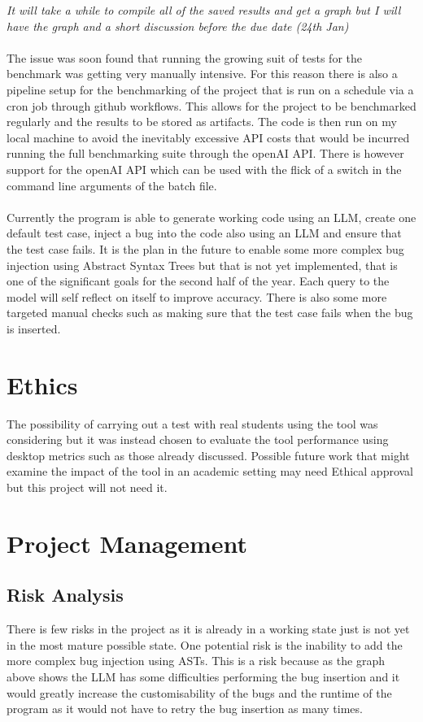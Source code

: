\documentclass[12pt]{extarticle}
\begin{document}
\textit{It will take a while to compile all of the saved results and get a graph but I will have the graph and a short discussion before the due date (24th Jan)}\\
\\
The issue was soon found that running the growing suit of tests for the benchmark was getting very manually intensive. For this reason there is also a pipeline setup for the benchmarking of the project that is run on a schedule via a cron job through github workflows. This allows for the project to be benchmarked regularly and the results to be stored as artifacts. The code is then run on my local machine to avoid the inevitably excessive API costs that would be incurred running the full benchmarking suite through the openAI API. There is however support for the openAI API which can be used with the flick of a switch in the command line arguments of the batch file.\\
\\
Currently the program is able to generate working code using an LLM, create one default test case, inject a bug into the code also using an LLM and ensure that the test case fails. It is the plan in the future to enable some more complex bug injection using Abstract Syntax Trees but that is not yet implemented, that is one of the significant goals for the second half of the year. Each query to the model will self reflect on itself to improve accuracy. There is also some more targeted manual checks such as making sure that the test case fails when the bug is inserted.

\section{Ethics}

The possibility of carrying out a test with real students using the tool was considering but it was instead chosen to evaluate the tool performance using desktop metrics such as those already discussed. Possible future work that might examine the impact of the tool in an academic setting may need Ethical approval but this project will not need it.

\section{Project Management}
\subsection{Risk Analysis}
There is few risks in the project as it is already in a working state just is not yet in the most mature possible state. One potential risk is the inability to add the more complex bug injection using ASTs. This is a risk because as the graph above shows the LLM has some difficulties performing the bug insertion and it would greatly increase the customisability of the bugs and the runtime of the program as it would not have to retry the bug insertion as many times. 
\end{document}
